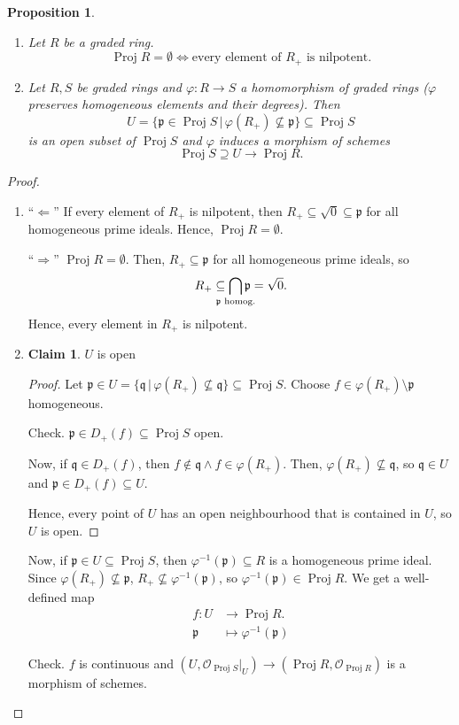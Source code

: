 \documentclass[12pt]{article}
\DeclareMathOperator{\Proj}{Proj}
\newtheorem*{proposition}{Proposition}
\theoremstyle{definition}
\newtheorem*{claim}{Claim}
\begin{document}
\begin{proposition}
\begin{enumerate}[label=\arabic*)]
\item Let $R$ be a graded ring.
\[\Proj R=\emptyset\Longleftrightarrow\text{every element of }R_+\text{ is nilpotent}.\]

\item Let $R,S$ be graded rings and $\varphi:R\rightarrow S$ a homomorphism of graded rings ($\varphi$ preserves homogeneous elements and their degrees). Then
\[U=\big\{\mathfrak{p}\in\Proj S\,\big|\,\varphi(R_+)\not\subseteq\mathfrak{p}\big\}\subseteq\Proj S\]
is an open subset of $\Proj S$ and $\varphi$ induces a morphism of schemes
\[\Proj S\supseteq U\longrightarrow\Proj R.\]
\end{enumerate}
\end{proposition}

\begin{proof}
\begin{enumerate}[label=\arabic*)]
\item ``$\Leftarrow$'' If every element of $R_+$ is nilpotent, then $R_+\subseteq\sqrt{0}\subseteq\mathfrak{p}$ for all homogeneous prime ideals. Hence, $\Proj R=\emptyset$.

``$\Rightarrow$'' $\Proj R=\emptyset$. Then, $R_+\subseteq\mathfrak{p}$ for all homogeneous prime ideals, so
\[R_+\subseteq\bigcap_{\mathclap{\mathfrak{p}\text{ homog.}}}\mathfrak{p}=\sqrt{0}.\]
Hence, every element in $R_+$ is nilpotent.

\item
\begin{claim}
$U$ is open
\end{claim}

\begin{proof}
Let $\mathfrak{p}\in U=\{\mathfrak{q}\,|\,\varphi(R_+)\not\subseteq\mathfrak{q}\}\subseteq\Proj S$. Choose $f\in\varphi(R_+)\setminus\mathfrak{p}$ homogeneous.

Check. $\mathfrak{p}\in D_+(f)\subseteq\Proj S$ open.

Now, if $\mathfrak{q}\in D_+(f)$, then $f\notin\mathfrak{q}\wedge f\in\varphi(R_+)$. Then, $\varphi(R_+)\not\subseteq\mathfrak{q}$, so $\mathfrak{q}\in U$ and $\mathfrak{p}\in D_+(f)\subseteq U$.

Hence, every point of $U$ has an open neighbourhood that is contained in $U$, so $U$ is open.
\end{proof}

Now, if $\mathfrak{p}\in U\subseteq\Proj S$, then $\varphi^{-1}(\mathfrak{p})\subseteq R$ is a homogeneous prime ideal. Since $\varphi(R_+)\not\subseteq\mathfrak{p}$, $R_+\not\subseteq\varphi^{-1}(\mathfrak{p})$, so $\varphi^{-1}(\mathfrak{p})\in\Proj R$. We get a well-defined map
\begin{align*}
f:U&\longrightarrow\Proj R.\\
\mathfrak{p}&\longmapsto\varphi^{-1}(\mathfrak{p})
\end{align*}

Check. $f$ is continuous and $(U,\mathcal{O}_{\Proj S}|_U)\rightarrow(\Proj R,\mathcal{O}_{\Proj R})$ is a morphism of schemes.
\end{enumerate}
\end{proof}
\end{document}
